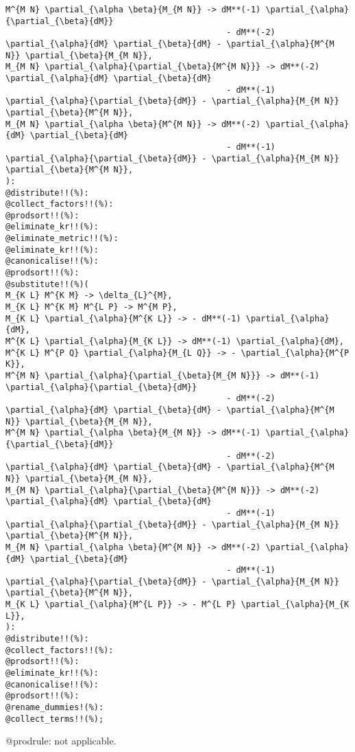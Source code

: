 \documentclass[11pt]{article}
\begin{document}
{\begin{verbatim}
M^{M N} \partial_{\alpha \beta}{M_{M N}} -> dM**(-1) \partial_{\alpha}{\partial_{\beta}{dM}}
                                             - dM**(-2) \partial_{\alpha}{dM} \partial_{\beta}{dM} - \partial_{\alpha}{M^{M N}} \partial_{\beta}{M_{M N}},
M_{M N} \partial_{\alpha}{\partial_{\beta}{M^{M N}}} -> dM**(-2) \partial_{\alpha}{dM} \partial_{\beta}{dM}
                                             - dM**(-1) \partial_{\alpha}{\partial_{\beta}{dM}} - \partial_{\alpha}{M_{M N}} \partial_{\beta}{M^{M N}},
M_{M N} \partial_{\alpha \beta}{M^{M N}} -> dM**(-2) \partial_{\alpha}{dM} \partial_{\beta}{dM}
                                             - dM**(-1) \partial_{\alpha}{\partial_{\beta}{dM}} - \partial_{\alpha}{M_{M N}} \partial_{\beta}{M^{M N}},
):
@distribute!!(%):
@collect_factors!!(%):
@prodsort!!(%):
@eliminate_kr!!(%):
@eliminate_metric!!(%):
@eliminate_kr!!(%):
@canonicalise!!(%):
@prodsort!!(%):
@substitute!!(%)(
M_{K L} M^{K M} -> \delta_{L}^{M},
M_{K L} M^{K M} M^{L P} -> M^{M P},
M_{K L} \partial_{\alpha}{M^{K L}} -> - dM**(-1) \partial_{\alpha}{dM},
M^{K L} \partial_{\alpha}{M_{K L}} -> dM**(-1) \partial_{\alpha}{dM},
M^{K L} M^{P Q} \partial_{\alpha}{M_{L Q}} -> - \partial_{\alpha}{M^{P K}},
M^{M N} \partial_{\alpha}{\partial_{\beta}{M_{M N}}} -> dM**(-1) \partial_{\alpha}{\partial_{\beta}{dM}}
                                             - dM**(-2) \partial_{\alpha}{dM} \partial_{\beta}{dM} - \partial_{\alpha}{M^{M N}} \partial_{\beta}{M_{M N}},
M^{M N} \partial_{\alpha \beta}{M_{M N}} -> dM**(-1) \partial_{\alpha}{\partial_{\beta}{dM}}
                                             - dM**(-2) \partial_{\alpha}{dM} \partial_{\beta}{dM} - \partial_{\alpha}{M^{M N}} \partial_{\beta}{M_{M N}},
M_{M N} \partial_{\alpha}{\partial_{\beta}{M^{M N}}} -> dM**(-2) \partial_{\alpha}{dM} \partial_{\beta}{dM}
                                             - dM**(-1) \partial_{\alpha}{\partial_{\beta}{dM}} - \partial_{\alpha}{M_{M N}} \partial_{\beta}{M^{M N}},
M_{M N} \partial_{\alpha \beta}{M^{M N}} -> dM**(-2) \partial_{\alpha}{dM} \partial_{\beta}{dM}
                                             - dM**(-1) \partial_{\alpha}{\partial_{\beta}{dM}} - \partial_{\alpha}{M_{M N}} \partial_{\beta}{M^{M N}},
M_{K L} \partial_{\alpha}{M^{L P}} -> - M^{L P} \partial_{\alpha}{M_{K L}},
):
@distribute!!(%):
@collect_factors!!(%):
@prodsort!!(%):
@eliminate_kr!!(%):
@canonicalise!!(%):
@prodsort!!(%):
@rename_dummies!(%):
@collect_terms!!(%);
\end{verbatim}}
@prodrule: not applicable.
\end{document}
